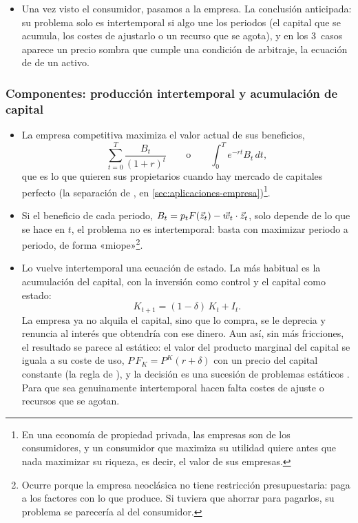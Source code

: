 \documentclass[11pt]{article}
\begin{document}
\begin{itemize}
\item Una vez visto el consumidor, pasamos a la empresa. La conclusión anticipada: su problema solo es intertemporal si algo une los periodos (el capital que se acumula, los costes de ajustarlo o un recurso que se agota), y en los 3~casos aparece un precio sombra que cumple una condición de arbitraje, la ecuación de  de un activo.
\end{itemize}

\subsubsection{Componentes: producción intertemporal y acumulación de capital}\label{sec:componentes-empresa}

\begin{itemize}
\item La empresa competitiva maximiza el valor actual de sus beneficios,
  \begin{equation*}
  \sum_{t=0}^{T}\frac{B_t}{(1+r)^t}\qquad\text{o}\qquad\int_0^{T}e^{-rt}B_t\,dt,
  \end{equation*}
  que es lo que quieren sus propietarios cuando hay mercado de capitales perfecto (la separación de , en \ref{sec:aplicaciones-empresa})\footnote{En una economía de propiedad privada, las empresas son de los consumidores, y un consumidor que maximiza su utilidad quiere antes que nada maximizar su riqueza, es decir, el valor de sus empresas.}.
\item Si el beneficio de cada periodo, $B_t=p_tF(\vec{z}_t)-\vec{w}_t\cdot\vec{z}_t$, solo depende de lo que se hace en $t$, el problema no es intertemporal: basta con maximizar periodo a periodo, de forma «miope»\footnote{Ocurre porque la empresa neoclásica no tiene restricción presupuestaria: paga a los factores con lo que produce. Si tuviera que ahorrar para pagarlos, su problema se parecería al del consumidor.}.
\item Lo vuelve intertemporal una ecuación de estado. La más habitual es la acumulación del capital, con la inversión como control y el capital como estado:
  \begin{equation*}
  K_{t+1}=(1-\delta)\,K_t+I_t.
  \end{equation*}
  La empresa ya no alquila el capital, sino que lo compra, se le deprecia y renuncia al interés que obtendría con ese dinero. Aun así, sin más fricciones, el resultado se parece al estático: el valor del producto marginal del capital se iguala a su coste de uso, $P\,F_K=P^K(r+\delta)$ con un precio del capital constante (la regla de ), y la decisión es una sucesión de problemas estáticos . Para que sea genuinamente intertemporal hacen falta costes de ajuste o recursos que se agotan.
\end{itemize}
\end{document}

